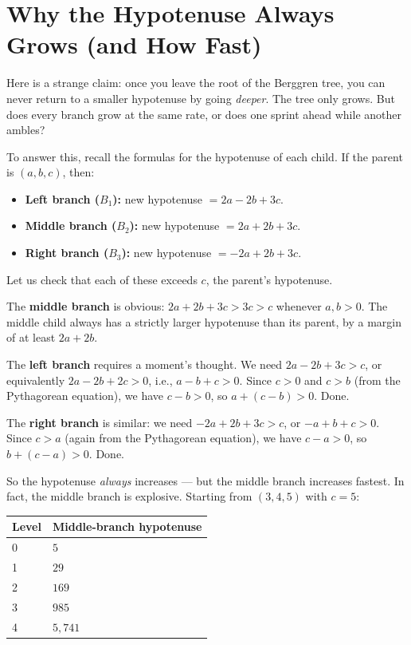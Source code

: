\ornbreak



\section{Why the Hypotenuse Always Grows (and How Fast)}


Here is a strange claim: once you leave the root of the Berggren tree, you can never return to a smaller hypotenuse by going \textit{deeper}. The tree only grows. But does every branch grow at the same rate, or does one sprint ahead while another ambles?

To answer this, recall the formulas for the hypotenuse of each child. If the parent is $(a, b, c)$, then:

\begin{itemize}[leftmargin=*]
\item \textbf{Left branch ($B_1$):} new hypotenuse $= 2a - 2b + 3c$.
\item \textbf{Middle branch ($B_2$):} new hypotenuse $= 2a + 2b + 3c$.
\item \textbf{Right branch ($B_3$):} new hypotenuse $= -2a + 2b + 3c$.
\end{itemize}

Let us check that each of these exceeds $c$, the parent's hypotenuse.

The \textbf{middle branch} is obvious: $2a + 2b + 3c > 3c > c$ whenever $a, b > 0$. The middle child always has a strictly larger hypotenuse than its parent, by a margin of at least $2a + 2b$.

The \textbf{left branch} requires a moment's thought. We need $2a - 2b + 3c > c$, or equivalently $2a - 2b + 2c > 0$, i.e., $a - b + c > 0$. Since $c > 0$ and $c > b$ (from the Pythagorean equation), we have $c - b > 0$, so $a + (c - b) > 0$. Done.

The \textbf{right branch} is similar: we need $-2a + 2b + 3c > c$, or $-a + b + c > 0$. Since $c > a$ (again from the Pythagorean equation), we have $c - a > 0$, so $b + (c - a) > 0$. Done.

So the hypotenuse \textit{always} increases --- but the middle branch increases fastest. In fact, the middle branch is explosive. Starting from $(3, 4, 5)$ with $c = 5$:

\begin{center}
\small
\begin{tabular}{ll}
\toprule
Level & Middle-branch hypotenuse \\
\midrule
0 & $5$ \\
1 & $29$ \\
2 & $169$ \\
3 & $985$ \\
4 & $5{,}741$ \\
\bottomrule
\end{tabular}
\end{center}


